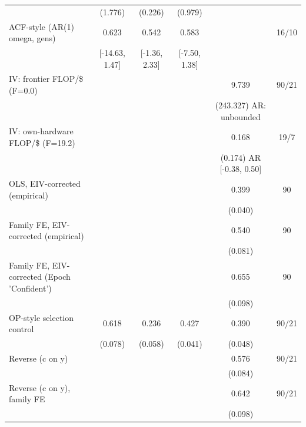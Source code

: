 \begin{table}[!htbp]
\begin{threeparttable}
\begin{tabular}{lccccc}
 & (1.776) & (0.226) & (0.979) &  &  \\
ACF-style (AR(1) omega, gens) & 0.623 & 0.542 & 0.583 &  & 16/10 \\
 & [-14.63, 1.47] & [-1.36, 2.33] & [-7.50, 1.38] &  &  \\
IV: frontier FLOP/\$ (F=0.0) &  &  &  & 9.739 & 90/21 \\
 &  &  &  & (243.327) AR: unbounded &  \\
IV: own-hardware FLOP/\$ (F=19.2) &  &  &  & 0.168 & 19/7 \\
 &  &  &  & (0.174) AR [-0.38, 0.50] &  \\
OLS, EIV-corrected (empirical) &  &  &  & 0.399 & 90 \\
 &  &  &  & (0.040) &  \\
Family FE, EIV-corrected (empirical) &  &  &  & 0.540 & 90 \\
 &  &  &  & (0.081) &  \\
Family FE, EIV-corrected (Epoch 'Confident') &  &  &  & 0.655 & 90 \\
 &  &  &  & (0.098) &  \\
OP-style selection control & 0.618 & 0.236 & 0.427 & 0.390 & 90/21 \\
 & (0.078) & (0.058) & (0.041) & (0.048) &  \\
Reverse (c on y) &  &  &  & 0.576 & 90/21 \\
 &  &  &  & (0.084) &  \\
Reverse (c on y), family FE &  &  &  & 0.642 & 90/21 \\
 &  &  &  & (0.098) &  \\
\bottomrule
\end{tabular}
\begin{tablenotes}[flushleft]
\footnotesize

\end{tablenotes}
\end{threeparttable}
\end{table}
